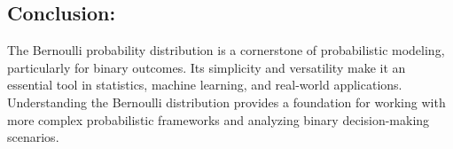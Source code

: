 \subsection*{Conclusion:}
The Bernoulli probability distribution is a cornerstone of probabilistic modeling, particularly for binary outcomes. Its simplicity and versatility make it an essential tool in statistics, machine learning, and real-world applications. Understanding the Bernoulli distribution provides a foundation for working with more complex probabilistic frameworks and analyzing binary decision-making scenarios.
